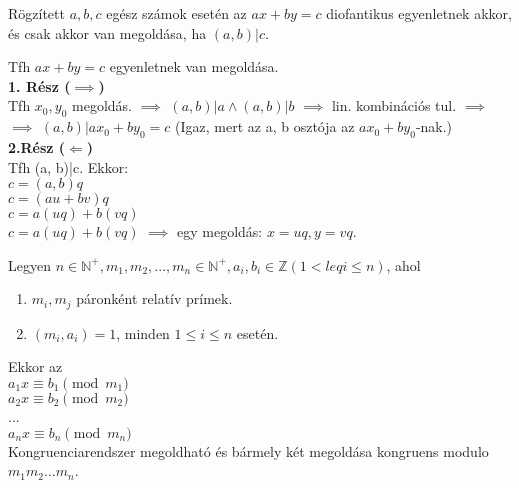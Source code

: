 \begin{frame}

\begin{tcolorbox}[title={Tétel: A diofantikus egyenlet megoldása}]
Rögzített $a, b, c$ egész számok esetén az \textbf{$ax + by = c$} diofantikus egyenletnek akkor, és csak akkor van megoldása, ha $(a, b)|c$.
\end{tcolorbox}

\begin{tcolorbox}[title={Bizonyítás}]
Tfh $ax + by = c$ egyenletnek van megoldása.\\
\textbf{1. Rész ($\implies$)}\\
\smallskip
Tfh $x_0, y_0$ megoldás. $\implies$ $(a, b)|a \land (a, b)|b$ $\implies$ lin. kombinációs tul. $\implies$\\
$\implies$ $(a, b)|ax_0 + by_0 = c$ (Igaz, mert az a, b osztója az $ax_0 + by_0$-nak.)\\
\bigskip
\textbf{2.Rész ($\Longleftarrow$)}\\
\smallskip
Tfh (a, b)|c. Ekkor:\\
$c = (a, b)q$\\
$c = (au + bv)q$\\
$c = a(uq) + b(vq)$\\
$c = a(uq) + b(vq)$ $\implies$ egy megoldás: $x = uq, y = vq$.\\

\end{tcolorbox}

\end{frame}

\begin{frame}

\begin{tcolorbox}[title={Tétel: Kínai maradéktétel}]
Legyen $n \in \mathbb{N}^+, m_1, m_2, ..., m_n \in \mathbb{N}^+, a_i, b_i \in \mathbb{Z} (1 <leq i \leq n)$, ahol
\begin{enumerate}
\item $m_i, m_j$ páronként relatív prímek.
\item $(m_i, a_i) = 1$, minden $1 \leq i \leq n$ esetén.
\end{enumerate}
Ekkor az\\
\bigskip
	$a_1x \equiv b_1 \pmod{m_1}$\\
	$a_2x \equiv b_2 \pmod{m_2}$\\
	...\\
	$a_nx \equiv b_n \pmod{m_n}$\\
\bigskip
Kongruenciarendszer megoldható és bármely két megoldása kongruens modulo $m_1m_2...m_n$.

\end{tcolorbox}

\end{frame}

